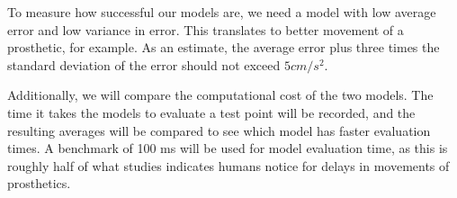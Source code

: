 \documentclass[12pt]{article}
\begin{document}
To measure how successful our models are, we need a model with low average error and low variance in error. This translates to better movement of a prosthetic, for example. As an estimate, the average error plus three times the standard deviation of the error should not exceed $5 cm/s^2$. 

Additionally, we will compare the computational cost of the two models. The time it takes the models to evaluate a test point will be recorded, and the resulting averages will be compared to see which model has faster evaluation times. A benchmark of 100 ms will be used for model evaluation time, as this is roughly half of what studies indicates humans notice for delays in movements of prosthetics.



\end{document}
